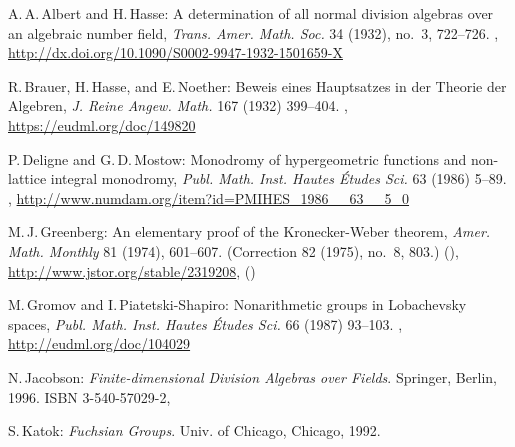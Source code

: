 \begin{references}{99}

A.\,A.\,Albert and H.\,Hasse:
A determination of all normal division algebras over an algebraic number field,
\emph{Trans. Amer. Math. Soc.} 34 (1932), no.~3, 722--726. 
,
\maynewline
\url{http://dx.doi.org/10.1090/S0002-9947-1932-1501659-X}


R.\,Brauer, H.\,Hasse, and E.\,Noether:
Beweis eines Hauptsatzes in der Theorie der Algebren, 
\emph{J. Reine Angew. Math.} 167 (1932) 399--404.
,
\maynewline
\url{https://eudml.org/doc/149820}

 P.\,Deligne and G.\,D.\,Mostow:
 Monodromy of hypergeometric functions and non-lattice
integral monodromy,
 \emph{Publ. Math. Inst. Hautes \'Etudes Sci.} 63 (1986) 5--89.
 ,
 \maynewline
 \url{http://www.numdam.org/item?id=PMIHES_1986__63__5_0}


M.\,J.\,Greenberg:
An elementary proof of the Kronecker-Weber theorem, 
\emph{Amer. Math. Monthly} 81 (1974), 601--607.
(Correction  82 (1975), no.~8, 803.)
 (),
\maynewline
\url{http://www.jstor.org/stable/2319208},
(\href{http://www.jstor.org/stable/2319794}{})

 M.\,Gromov and I.\,Piatetski-Shapiro:
 Nonarithmetic groups in Lobachevsky spaces,
 \emph{Publ. Math. Inst. Hautes \'Etudes Sci.}
 66 (1987) 93--103. 
 ,
 \maynewline
 \url{http://eudml.org/doc/104029}

N.\,Jacobson:
\emph{Finite-dimensional Division Algebras over Fields}.
Springer, Berlin, 1996.
ISBN 3-540-57029-2,

 S.\,Katok:
 \emph{Fuchsian Groups}.
 Univ. of Chicago, Chicago, 1992.


\end{references}
